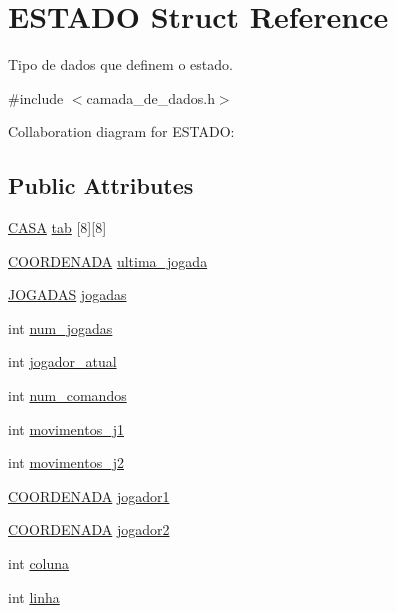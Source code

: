 \hypertarget{structESTADO}{}\section{E\+S\+T\+A\+DO Struct Reference}
\label{structESTADO}


Tipo de dados que definem o estado.  




{\ttfamily \#include $<$camada\+\_\+de\+\_\+dados.\+h$>$}



Collaboration diagram for E\+S\+T\+A\+DO\+:
\subsection*{Public Attributes}
\begin{DoxyCompactItemize}
\item 
\hyperlink{camada__de__dados_8h_aba91601f16d4c485b2d9b8c429f27039}{C\+A\+SA} \hyperlink{structESTADO_ab56f0f1be16954d3768b4174d14c087d}{tab} \mbox{[}8\mbox{]}\mbox{[}8\mbox{]}
\item 
\hyperlink{structCOORDENADA}{C\+O\+O\+R\+D\+E\+N\+A\+DA} \hyperlink{structESTADO_a4896a5c5c1f40b43fb795623327e3f47}{ultima\+\_\+jogada}
\item 
\hyperlink{camada__de__dados_8h_a94c221d29a1760f008b7834093259b7d}{J\+O\+G\+A\+D\+AS} \hyperlink{structESTADO_afae43b87a488fad0f2b56a18bad31d18}{jogadas}
\item 
int \hyperlink{structESTADO_a261495728744647e618b4e623f5a4b7a}{num\+\_\+jogadas}
\item 
int \hyperlink{structESTADO_a5dd28e2e68b7aef2b6b7ea88e02eff58}{jogador\+\_\+atual}
\item 
int \hyperlink{structESTADO_abe6faacdd6111160bf9a354f44b95b38}{num\+\_\+comandos}
\item 
int \hyperlink{structESTADO_a48e60cf831e7351c8d0afae433f3c674}{movimentos\+\_\+j1}
\item 
int \hyperlink{structESTADO_a21a8bb9b8cb21ffc06256242516f5a67}{movimentos\+\_\+j2}
\item 
\hyperlink{structCOORDENADA}{C\+O\+O\+R\+D\+E\+N\+A\+DA} \hyperlink{structESTADO_a18e430d344b0af279061c0ef8273ea59}{jogador1}
\item 
\hyperlink{structCOORDENADA}{C\+O\+O\+R\+D\+E\+N\+A\+DA} \hyperlink{structESTADO_a4fe7d0098c4e4ba7db1998fbc2be7e9f}{jogador2}
\item 
int \hyperlink{structESTADO_a1ebc28eba173a8182dfbd568ed2eab4b}{coluna}
\item 
int \hyperlink{structESTADO_a271ffaca9d826cce8498a791abcf952a}{linha}
\end{DoxyCompactItemize}


